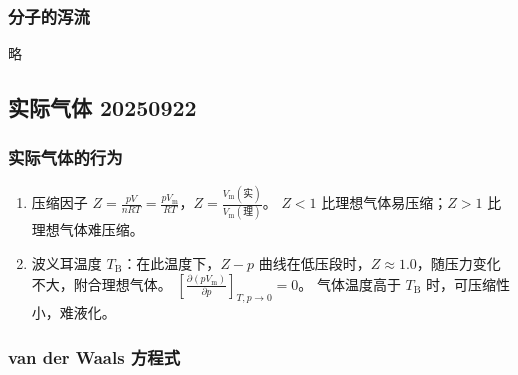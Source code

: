 \subsubsection{分子的泻流}
略

\subsection{实际气体 20250922}

\subsubsection{实际气体的行为}

\begin{enumerate}
    \item 压缩因子 $Z = \frac{pV}{nRT} = \frac{p V_{\mathrm{m}}}{RT}$，$Z = \frac{V_{\mathrm{m}}(\text{实})}{V_{\mathrm{m}}(\text{理})}$。 $Z < 1$ 比理想气体易压缩；$Z > 1$ 比理想气体难压缩。
    \item 波义耳温度 $T_{\mathrm{B}}$：在此温度下，$Z-p$ 曲线在低压段时，$Z \approx 1.0$，随压力变化不大，附合理想气体。 $\left[ \frac{\partial(p V_{\mathrm{m}})}{\partial p} \right]_{T, p \to 0} = 0$。 气体温度高于 $T_{\mathrm{B}}$ 时，可压缩性小，难液化。
\end{enumerate}

\subsubsection{van der Waals 方程式}

